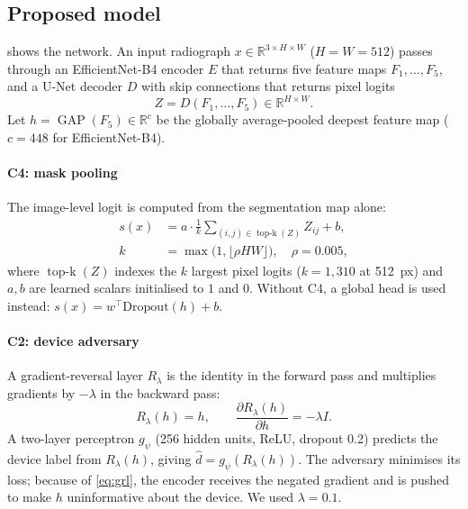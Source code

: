 \documentclass{ieeeaccess}
\DeclareMathOperator*{\topk}{top\text{-}k}
\DeclareMathOperator{\GAP}{GAP}
\begin{document}
\subsection{Proposed model}
\label{sec:model}
 shows the network. An input radiograph $x\in\mathbb{R}^{3\times H\times W}$ ($H=W=512$) passes through an EfficientNet-B4 encoder $E$ that returns five feature maps $F_1,\dots,F_5$, and a U-Net decoder $D$ \cite{ronneberger2015unet} with skip connections that returns pixel logits
\begin{equation}
Z = D(F_1,\dots,F_5)\in\mathbb{R}^{H\times W}.
\label{eq:seg}
\end{equation}
Let $h=\GAP(F_5)\in\mathbb{R}^{c}$ be the globally average-pooled deepest feature map ($c=448$ for EfficientNet-B4).

\paragraph{C4: mask pooling}
The image-level logit is computed from the segmentation map alone:
\begin{equation}
\begin{aligned}
s(x) &= a\cdot\frac{1}{k}\sum_{(i,j)\in\topk(Z)} Z_{ij} + b,\\
k &=\max\big(1,\lfloor\rho HW\rfloor\big),\quad \rho=0.005,
\end{aligned}
\label{eq:maskpool}
\end{equation}
where $\topk(Z)$ indexes the $k$ largest pixel logits ($k=1{,}310$ at 512~px) and $a,b$ are learned scalars initialised to $1$ and $0$. Without C4, a global head is used instead: $s(x)=w^\top \mathrm{Dropout}(h)+b$.

\paragraph{C2: device adversary}
A gradient-reversal layer $R_\lambda$ \cite{ganin2015dann} is the identity in the forward pass and multiplies gradients by $-\lambda$ in the backward pass:
\begin{equation}
R_\lambda(h)=h,\qquad \frac{\partial R_\lambda(h)}{\partial h}=-\lambda I.
\label{eq:grl}
\end{equation}
A two-layer perceptron $g_\psi$ (256 hidden units, ReLU, dropout 0.2) predicts the device label from $R_\lambda(h)$, giving $\hat d = g_\psi(R_\lambda(h))$. The adversary minimises its loss; because of \cref{eq:grl}, the encoder receives the negated gradient and is pushed to make $h$ uninformative about the device. We used $\lambda=0.1$.
\end{document}
